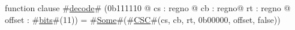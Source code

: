 function clause #\hyperref[zdecode]{decode}# (0b111110 @ cs : regno @ cb : regno@ rt : regno @ offset : #\hyperref[zbits]{bits}#(11)) = #\hyperref[zSome]{Some}#(#\hyperref[zCSC]{CSC}#(cs, cb, rt, 0b00000, offset, false))

